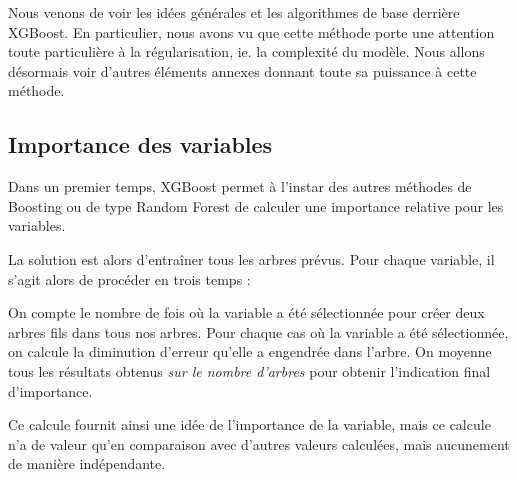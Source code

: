 Nous venons de voir les idées générales et les algorithmes de base derrière XGBoost. En particulier, nous avons vu que cette méthode porte une attention toute particulière à la régularisation, ie. la complexité du modèle. Nous allons désormais voir d'autres éléments annexes donnant toute sa puissance à cette méthode.

\subsection{Importance des variables}
Dans un premier temps, XGBoost permet à l'instar des autres méthodes de Boosting ou de type Random Forest de calculer une importance relative pour les variables.

La solution est alors d'entraîner tous les arbres prévus. Pour chaque variable, il s'agit alors de procéder en trois temps :
\begin{itemize}
	On compte le nombre de fois où la variable a été sélectionnée pour créer deux arbres fils dans tous nos arbres.
	Pour chaque cas où la variable a été sélectionnée, on calcule la diminution d'erreur qu'elle a engendrée dans l'arbre.
	On moyenne tous les résultats obtenus \textit{sur le nombre d'arbres} pour obtenir l'indication final d'importance.
\end{itemize}

Ce calcule fournit ainsi une idée de l'importance de la variable, mais ce calcule n'a de valeur qu'en comparaison avec d'autres valeurs calculées, mais aucunement de manière indépendante.
